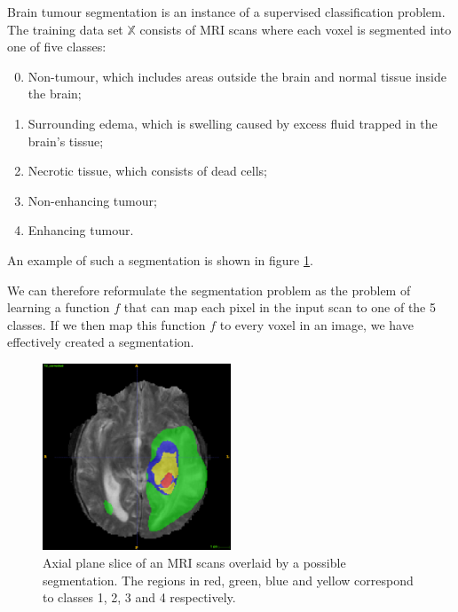 \documentclass[12pt,a4paper,twoside,openright]{report}
\begin{document}
Brain tumour segmentation is an instance of a supervised classification problem. The training data set $\mathbb{X}$ consists of MRI scans where each voxel is segmented into one of five classes:
\begin{enumerate}
	\setcounter{enumi}{-1}
	\item Non-tumour, which includes areas outside the brain and normal tissue inside the brain;
	\item Surrounding edema, which is swelling caused by excess fluid trapped in the brain's tissue;
	\item Necrotic tissue, which consists of dead cells;
	\item Non-enhancing tumour;
	\item Enhancing tumour.
\end{enumerate} 
An example of such a segmentation is shown in figure \ref{fig:example_segmentation}.

We can therefore reformulate the segmentation problem as the problem of learning a function $f$ that can map each pixel in the input scan to one of the 5 classes. If we then map this function $f$ to every voxel in an image, we have effectively created a segmentation.

\begin{figure}
	\centering
	\includegraphics[width = 0.5\textwidth]{challenge_1_segmentation_with_T2_66}
	\caption[Axial plane slice of an MRI scans overlaid by a possible segmentation.]{Axial plane slice of an MRI scans overlaid by a possible segmentation. The regions in red, green, blue and yellow correspond to classes 1, 2, 3 and 4 respectively. }
	\label{fig:example_segmentation}
\end{figure}
\end{document}
